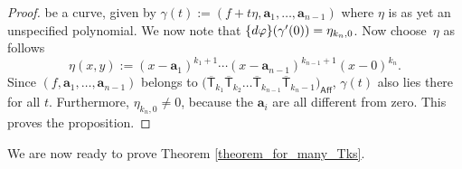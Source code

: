 \documentclass[11pt]{article}
\numberwithin{equation}{section}
\begin{document}
\begin{proof}
be a curve, given by
$\gamma(t) := (f+t\eta, \mathbf{a}_1, \dots, \mathbf{a}_{n-1})$
where $\eta$ is as yet an unspecified polynomial. We now note that
$\{{\rm d} \varphi\}(\gamma^{\prime}(0)) = \eta_{k_{n}, 0}$. Now choose~$\eta$ as follows
\[ \eta(x, y) := (x-\mathbf{a}_1)^{k_1+1} \cdots (x-\mathbf{a}_{n-1})^{k_{n-1}+1} (x-0)^{k_n}.\]
Since $(f, \mathbf{a}_1, \dots, \mathbf{a}_{n-1})$
belongs to $\bigl(\overline{\mathsf{T}}_{k_1} \overline{\mathsf{T}}_{k_2}
\dots \overline{\mathsf{T}}_{k_{n-1}} \overline{\mathsf{T}}_{k_{n}-1}\bigr)_{\mathsf{Aff}}$,
$\gamma(t)$
also lies there for all $t$.
Furthermore, $\eta_{k_n, 0} \neq 0$, because the $\mathbf{a}_i$ are all different from zero.
This proves the proposition.
\end{proof}

We are now ready to prove Theorem \ref{theorem_for_many_Tks}.
\end{document}
